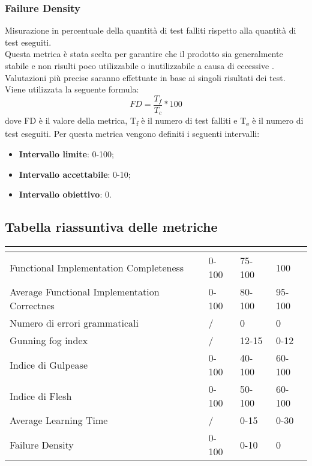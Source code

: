 \subsubsection{Failure Density}
Misurazione in percentuale della quantità di test falliti rispetto alla quantità di test eseguiti.
\\Questa metrica è stata scelta per garantire che il prodotto sia generalmente stabile e non risulti poco utilizzabile o inutilizzabile a causa di eccessive . Valutazioni più precise saranno effettuate in base ai singoli risultati dei test.\\
Viene utilizzata la seguente formula:
$$FD=\frac{T_f}{T_c}*100$$
dove FD è il valore della metrica, T\textsubscript{f} è il numero di test falliti e T\textsubscript{e} è il numero di test eseguiti.
Per questa metrica vengono definiti i seguenti intervalli: 
\begin{itemize}
	\item{\textbf{Intervallo limite}: 0-100;}
	\item{\textbf{Intervallo accettabile}: 0-10;}
	\item{\textbf{Intervallo obiettivo}: 0.}
\end{itemize}
\subsection{Tabella riassuntiva delle metriche}
\renewcommand{\arraystretch}{1.5}
\begin{table}[H]
	\centering
	\begin{tabular}{|C{4cm}|C{3cm}|C{3cm}|C{3cm}|}
		\hline
		\textbf{\color{title_text}{Nome Metrica}} & \textbf{\color{title_text}{Intervallo limite}} & \textbf{\color{title_text}{Range accettabile}} & \textbf{\color{title_text}{Range ottimale}} \\ \hline
		Functional Implementation Completeness & 0-100 & 75-100 & 100 \\ \hline
		Average Functional Implementation Correctnes&0-100&80-100&95-100 \\ \hline
		Numero di errori grammaticali & / & 0 & 0 \\ \hline
		Gunning fog index & / &12-15&0-12 \\ \hline
		Indice di Gulpease & 0-100& 40-100& 60-100 \\ \hline
		Indice di Flesh& 0-100 & 50-100& 60-100\\ \hline
		Average Learning Time& / &0-15 & 0-30 \\ \hline
		Failure Density&0-100&0-10&0\\ \hline
	\end{tabular}
\end{table}
\renewcommand{\arraystretch}{1}
\pagebreak

